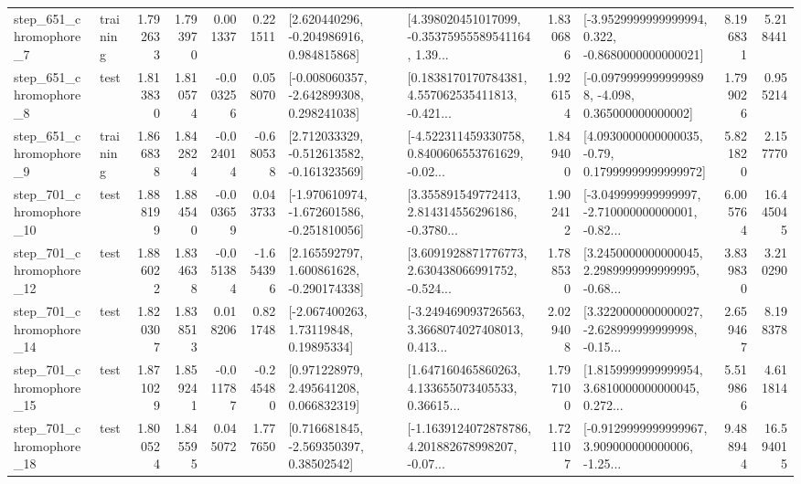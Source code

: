 \begin{tabular}{llrrrrllrlrr}
   step\_651\_chromophore\_7 &  training &      1.792633 &    1.793970 &      0.001337 &  0.221511 &    [2.620440296, -0.204986916, 0.984815868] &  [4.398020451017099, -0.35375955589541164, 1.39... &       1.830686 &  [-3.9529999999999994, 0.322, -0.8680000000000021] &            8.196831 &          5.218441 \\
   step\_651\_chromophore\_8 &      test &      1.813830 &    1.810574 &     -0.003256 &  0.058070 &   [-0.008060357, -2.642899308, 0.298241038] &  [0.1838170170784381, 4.557062535411813, -0.421... &       1.926154 &  [-0.09799999999999898, -4.098, 0.365000000000002] &            1.799026 &          0.955214 \\
   step\_651\_chromophore\_9 &  training &      1.866838 &    1.842824 &     -0.024014 & -0.680538 &   [2.712033329, -0.512613582, -0.161323569] &  [-4.522311459330758, 0.8400606553761629, -0.02... &       1.849400 &   [4.0930000000000035, -0.79, 0.17999999999999972] &            5.821820 &          2.157770 \\
  step\_701\_chromophore\_10 &      test &      1.888199 &    1.884540 &     -0.003659 &  0.043733 &  [-1.970610974, -1.672601586, -0.251810056] &  [3.355891549772413, 2.814314556296186, -0.3780... &       1.902412 &  [-3.049999999999997, -2.710000000000001, -0.82... &            6.005764 &         16.445045 \\
  step\_701\_chromophore\_12 &      test &      1.886022 &    1.834638 &     -0.051384 & -1.654396 &    [2.165592797, 1.600861628, -0.290174338] &  [3.6091928871776773, 2.630438066991752, -0.524... &       1.788530 &  [3.2450000000000045, 2.2989999999999995, -0.68... &            3.839830 &          3.210290 \\
  step\_701\_chromophore\_14 &      test &      1.820307 &    1.838513 &      0.018206 &  0.821748 &      [-2.067400263, 1.73119848, 0.19895334] &  [-3.249469093726563, 3.3668074027408013, 0.413... &       2.029408 &  [3.3220000000000027, -2.628999999999998, -0.15... &            2.659467 &          8.198378 \\
  step\_701\_chromophore\_15 &      test &      1.871029 &    1.859241 &     -0.011787 & -0.245480 &     [0.971228979, 2.495641208, 0.066832319] &  [1.647160465860263, 4.133655073405533, 0.36615... &       1.797100 &  [1.8159999999999954, 3.6810000000000045, 0.272... &            5.519866 &          4.611814 \\
  step\_701\_chromophore\_18 &      test &      1.800524 &    1.845595 &      0.045072 &  1.777650 &     [0.716681845, -2.569350397, 0.38502542] &  [-1.1639124072878786, 4.201882678998207, -0.07... &       1.721107 &  [-0.9129999999999967, 3.909000000000006, -1.25... &            9.488944 &         16.594015 \\

\end{tabular}
